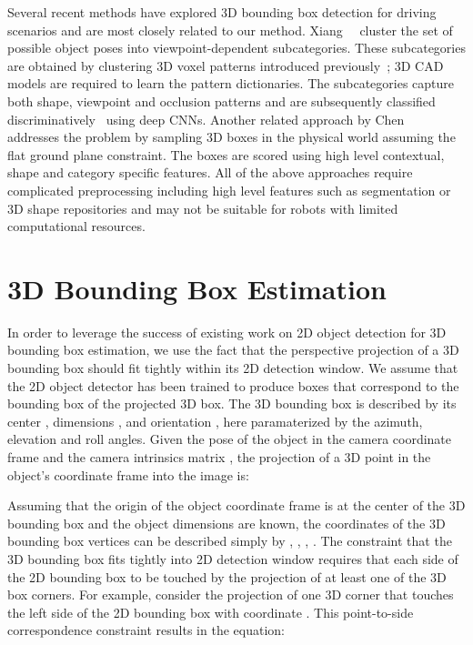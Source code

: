 \documentclass[10pt,twocolumn,letterpaper]{article}
\begin{document}
Several recent methods have explored 3D bounding box detection for driving scenarios and are most closely related to our method. Xiang~\etal~\cite{xiang_cvpr15,xiang2016subcategory} cluster the set of possible object poses into viewpoint-dependent subcategories. These subcategories are obtained by clustering 3D voxel patterns introduced  
previously~\cite{3DVP15}; 3D CAD models are required to learn the pattern dictionaries.
The subcategories capture both shape, viewpoint and occlusion patterns and are subsequently classified discriminatively~\cite{xiang2016subcategory} using deep CNNs. Another related approach by Chen~\etal~\cite{ChenUrtasunCVPR16}
addresses the problem by sampling 3D boxes
in the physical world assuming the flat ground plane constraint. The boxes are scored using high level contextual, shape and category specific features. All of the above approaches require complicated preprocessing including high level features such as segmentation or 3D shape repositories and may not be suitable for robots with limited computational resources. 

\section{3D Bounding Box Estimation}
In order to leverage the success of existing work on 2D object detection for 3D bounding box estimation, we use the fact that the perspective projection of a 3D bounding box should fit tightly within its 2D detection window. We assume that the 2D object detector has been trained to produce boxes that correspond to the bounding box of the projected 3D box. The 3D bounding box is described by its center , dimensions , and orientation  , here paramaterized by the azimuth, elevation and roll angles. Given the pose of the object in the camera coordinate frame  and the camera intrinsics matrix , the projection of a 3D point  in the object's coordinate frame into the image   is:

Assuming that the origin of the object coordinate frame is at the center of the 3D bounding box and the object dimensions  are known, the coordinates of the 3D bounding box vertices can be described simply by , ,  , . 
The constraint that the 3D bounding box fits tightly into 2D detection window requires that each side of the 2D bounding box to be touched by the projection of at least one of the 3D box corners.
For example, consider the projection of one 3D corner  that touches the left side of the 2D bounding box with coordinate .  This point-to-side correspondence constraint results in the equation: 
\end{document}
